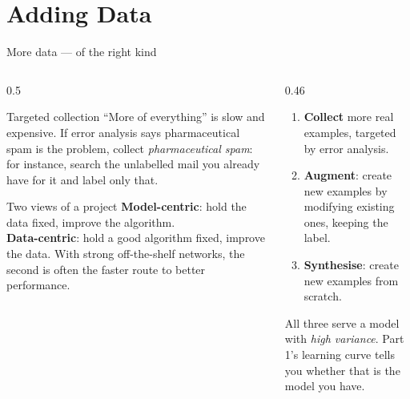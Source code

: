 \documentclass[aspectratio=169,10pt]{beamer}
\begin{document}
\section{Adding Data}

\begin{frame}{More data --- of the right kind}
  \begin{columns}[T,onlytextwidth]
    \begin{column}{0.5\textwidth}
      \begin{block}{Targeted collection}
        \footnotesize
        ``More of everything'' is slow and expensive. If error analysis says pharmaceutical
        spam is the problem, collect \emph{pharmaceutical spam}: for instance, search the
        unlabelled mail you already have for it and label only that.
      \end{block}
      \begin{block}{Two views of a project}
        \footnotesize
        \textbf{Model-centric}: hold the data fixed, improve the algorithm.\\[2pt]
        \textbf{Data-centric}: hold a good algorithm fixed, improve the data. With strong
        off-the-shelf networks, the second is often the faster route to better
        performance.
      \end{block}
    \end{column}
    \begin{column}{0.46\textwidth}
      \footnotesize
      \begin{defnbox}
        \small
        \begin{enumerate}
          \item \textbf{Collect} more real examples, targeted by error analysis.
          \item \textbf{Augment}: create new examples by modifying existing ones, keeping
                the label.
          \item \textbf{Synthesise}: create new examples from scratch.
        \end{enumerate}
      \end{defnbox}
      \begin{keyidea}
        All three serve a model with \emph{high variance}. Part 1's learning curve tells
        you whether that is the model you have.
      \end{keyidea}
    \end{column}
  \end{columns}
\end{frame}
\end{document}
